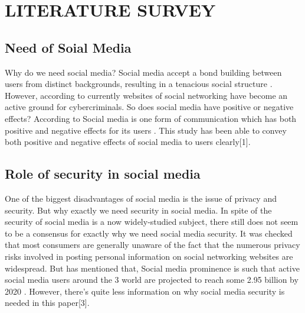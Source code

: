 \chapter{LITERATURE SURVEY	}

\section{	Need of Soial Media}
\hspace*{0.3in}Why do we need social media? Social media accept a bond
building between users from distinct backgrounds, resulting in
a tenacious social structure . However, according to 
currently websites of social networking have become an active
ground for cybercriminals. So does social media have positive
or negative effects? According to  Social media is one form
of communication which has both positive and negative
effects for its users . This study has been able to convey
both positive and negative effects of social media to users
clearly[1].
\\
\section{	Role of security in social media}
\hspace*{0.3in}One of the biggest disadvantages of social media is the issue
of privacy and security. But why exactly we need security in
social media. In spite of the security of social media is a now
widely-studied subject, there still does not seem to be a
consensus for exactly why we need social media security. It
was checked that most consumers are generally unaware of
the fact that the numerous privacy risks involved in posting
personal information on social networking websites are
widespread. But has mentioned that, Social media
prominence is such that active social media users around the
3
world are projected to reach some 2.95 billion by 2020 .
However, there’s quite less information on why social media
security is needed in this paper[3]. 

\\

